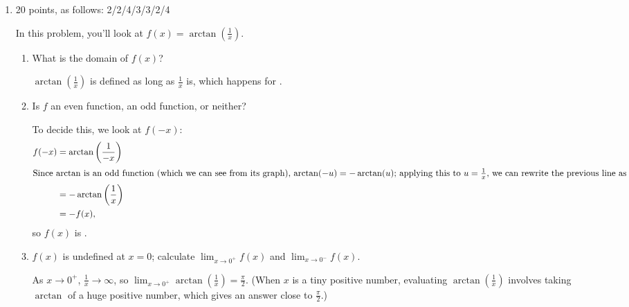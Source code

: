 \documentclass{article}
\begin{document}
\begin{enumerate}
\begin{enumerate}
  \end{enumerate}

\item 

\begin{grading}
    20 points, as follows: 2/2/4/3/3/2/4
\end{grading}

In this problem, you'll look at $f(x) = \arctan( \frac{1}{x})$.
  \begin{enumerate}

  \item
    \begin{problem}[\vfill]
      What is the domain of $f(x)$?
    \end{problem}

    \begin{solution}
      $\arctan \left( \frac{1}{x} \right)$ is defined as long as
      $\frac{1}{x}$ is, which happens for . 
    \end{solution}

  \item
    \begin{problem}[\vfill]
      Is $f$ an even function, an odd function, or neither?
    \end{problem}

    \begin{solution} 
      To decide this, we look at $f(-x)$:
      \begin{align*}
        f(-x) &= \arctan \left( \frac{1}{-x} \right) \\
        \intertext{Since $\arctan$ is an odd function (which we can see
          from its graph), $\arctan(-u) = - \arctan (u)$; applying this to
          $u = \frac{1}{x}$, we can rewrite the previous line as}
        &= - \arctan \left( \frac{1}{x} \right) \\
        &= - f(x),
      \end{align*}
      so $f(x)$ is . 
    \end{solution}

  \item
    \begin{problem}[\stretch{2}]
      $f(x)$ is undefined at $x = 0$; calculate $\displaystyle \lim_{x \to
        0^+} f(x)$ and $\displaystyle \lim_{x \to 0^-} f(x)$. 
    \end{problem}

    \begin{solution}
      As $x \to 0^+$, $\frac{1}{x} \to \infty$, so $\boxed{ \lim_{x \to
          0^+} \arctan \left( \frac{1}{x} \right) = \frac{\pi}{2}}$.
      (When $x$ is a tiny positive number, evaluating $\arctan \left(
        \frac{1}{x} \right)$ involves taking $\arctan$ of a huge positive
      number, which gives an answer close to $\frac{\pi}{2}$.)


\end{solution}
\end{enumerate}
\end{enumerate}
\end{document}
